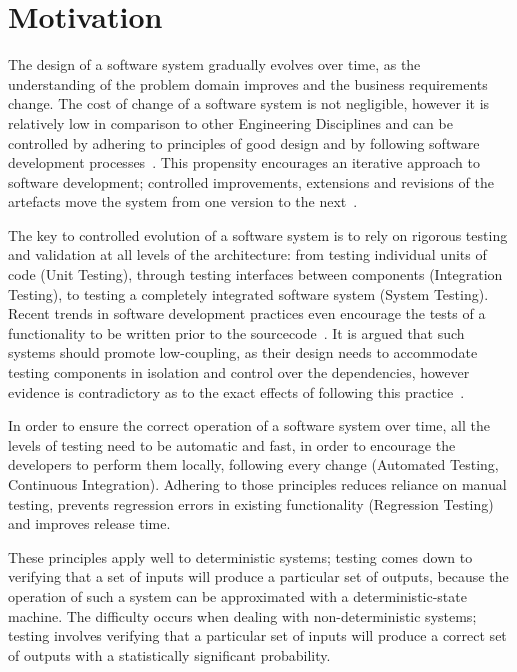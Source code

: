 \section{Motivation}
The design of a software system gradually evolves over time, as the understanding of the problem domain improves and the business requirements change. The cost of change of a software system is not negligible, however it is relatively low in comparison to other Engineering Disciplines and can be controlled by adhering to principles of good design and by following software development processes~\cite{Gof1995}. This propensity encourages an iterative approach to software development; controlled improvements, extensions and revisions of the artefacts move the system from one version to the next~\cite{AgileManifesto}. 

The key to controlled evolution of a software system is to rely on rigorous testing and validation at all levels of the architecture: from testing individual units of code (Unit Testing), through testing interfaces between components (Integration Testing), to testing a completely integrated software system (System Testing). Recent trends in software development practices even encourage the tests of a functionality to be written prior to the sourcecode~\cite{Beck2001}. It is argued that such systems should promote low-coupling, as their design needs to accommodate testing components in isolation and control over the dependencies, however evidence is contradictory as to the exact effects of following this practice~\cite{Siniaalto2007}.

In order to ensure the correct operation of a software system over time, all the levels of testing need to be automatic and fast, in order to encourage the developers to perform them locally, following every change (Automated Testing, Continuous Integration). Adhering to those principles reduces reliance on manual testing, prevents regression errors in existing functionality (Regression Testing) and improves release time.

These principles apply well to deterministic systems; testing comes down to verifying that a set of inputs will produce a particular set of outputs, because the operation of such a system can be approximated with a deterministic-state machine. The difficulty occurs when dealing with non-deterministic systems; testing involves verifying that a particular set of inputs will produce a correct set of outputs with a statistically significant probability.


